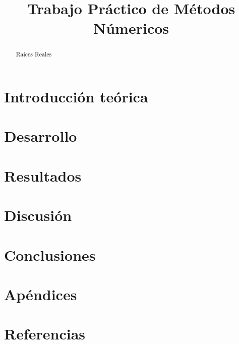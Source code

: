 \documentclass[a4paper,11pt]{article}
\title{Trabajo Práctico de Métodos Númericos}
\author{}
\begin{document}
\maketitle

\begin{abstract}
Raíces Reales
\end{abstract}

\newpage

\tableofcontents

\newpage

\section{Introducción teórica}



\section{Desarrollo}



\section{Resultados}



\section{Discusión}



\section{Conclusiones}



\section{Apéndices}



\section{Referencias}


\end{document}
